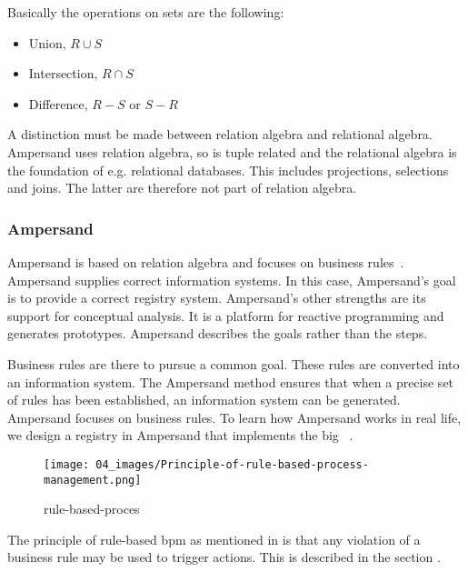 Basically the operations on sets are the following:
\begin{itemize}
    \item Union, $R \cup S$ %
    \item Intersection, $R \cap S$ %
    \item Difference, $R - S$ or $S - R$ %
\end{itemize}
A distinction must be made between relation algebra and relational algebra.
Ampersand uses relation algebra, so is tuple related and the relational algebra is the foundation of e.g. relational databases.
This includes projections, selections and joins.
The latter are therefore not part of relation algebra.


\subsubsection{Ampersand} \label{ampersand}
Ampersand is based on relation algebra and focuses on business rules~.
Ampersand supplies correct information systems.
In this case, Ampersand's goal is to provide a correct registry system.
Ampersand's other strengths are its support for conceptual analysis.
It is a platform for reactive programming and generates prototypes.
Ampersand describes the goals rather than the steps.

Business rules are there to pursue a common goal.
These rules are converted into an information system. 
The Ampersand method ensures that when a precise set of rules has been established, an information system can be generated. 
Ampersand focuses on business rules.
To learn how Ampersand works in real life, we design a registry in Ampersand that implements the \acrshort{big}~ .

\begin{wrapfigure} {r}{0.52\textwidth} 
\texttt{[image: 04\_images/Principle-of-rule-based-process-management.png]}
\caption{rule-based-proces}
\label{fig:rule-based-proces}
\end{wrapfigure}


The principle of rule-based \acrfull{bpm} as mentioned in  is that any violation of a business rule may be used to trigger actions. 
This is described in the section .

